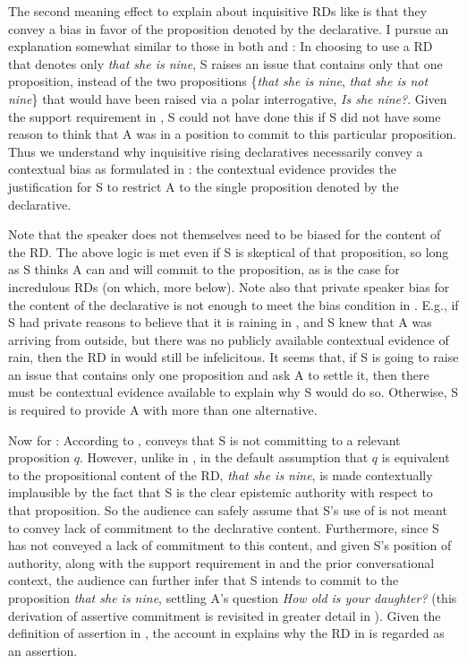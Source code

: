 \documentclass[output=paper,colorlinks,citecolor=brown]{langscibook}
\begin{document}
	The second meaning effect to explain about inquisitive RDs like  is that they convey a bias in favor of the proposition denoted by the declarative. I pursue an explanation somewhat similar to those in both \citet{rudin18} and \citet{westera18}: In choosing to use a RD that denotes only  \emph{that she is nine}, S raises an issue that contains only that one proposition, instead of the two propositions \{\emph{that she is nine}, \emph{that she is not nine}\} that would have been raised via a polar interrogative, \textit{Is she nine?}. Given the support requirement in , S could not have done this if S did not have some reason to think that A was in a position to commit to this particular proposition. Thus we understand why inquisitive rising declaratives necessarily convey a contextual bias as formulated in : the contextual evidence provides the justification for S to restrict A to the single proposition denoted by the declarative.
	
	Note that the speaker does not themselves need to be biased for the content of the RD. The above logic is met even if S is skeptical of that proposition, so long as S thinks A can and will commit to the proposition, as is the case for incredulous RDs (on which, more below). Note also that private speaker bias for the content of the declarative is not enough to meet the bias condition in . E.g., if S had private reasons to believe that it is raining in , and S knew that A was arriving from outside, but there was no publicly available contextual evidence of rain, then the RD in  would still be infelicitous. It seems that, if S is going to raise an issue that contains only one proposition and ask A to settle it, then there must be contextual evidence available to explain why S would do so. Otherwise, S is required to provide A with more than one alternative.
	
	Now for : According to , \rise conveys that S is not committing to a relevant proposition $q$. However, unlike in , in  the default assumption that $q$ is equivalent to the propositional content of the RD, \emph{that she is nine}, is made contextually implausible by the fact that S is the clear epistemic authority with respect to that proposition. So the audience can safely assume that S's use of \rise is not meant to convey lack of commitment to the declarative content. Furthermore, since S has not conveyed a lack of commitment to this content, and given S's position of authority, along with the support requirement in  and the prior conversational context, the audience can further infer that S intends to commit to the proposition \emph{that she is nine}, settling A's question \textit{How old is your daughter?} (this derivation of assertive commitment is revisited in greater detail in ). Given the definition of assertion in , the account in  explains why the RD in  is regarded as an assertion. 
	
\end{document}
